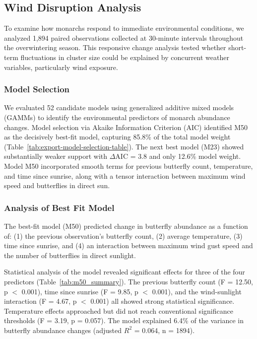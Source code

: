 \subsection{Wind Disruption Analysis}

To examine how monarchs respond to immediate environmental conditions, we analyzed 1,894 paired observations collected at 30-minute intervals throughout the overwintering season. This responsive change analysis tested whether short-term fluctuations in cluster size could be explained by concurrent weather variables, particularly wind exposure.

\subsubsection{Model Selection}

We evaluated 52 candidate models using generalized additive mixed models (GAMMs) to identify the environmental predictors of monarch abundance changes. Model selection via Akaike Information Criterion (AIC) identified M50 as the decisively best-fit model, capturing 85.8\% of the total model weight (Table~\ref{tab:export-model-selection-table}). The next best model (M23) showed substantially weaker support with $\Delta$AIC = 3.8 and only 12.6\% model weight. Model M50 incorporated smooth terms for previous butterfly count, temperature, and time since sunrise, along with a tensor interaction between maximum wind speed and butterflies in direct sun.

 

\subsubsection{Analysis of Best Fit Model}

The best-fit model (M50) predicted change in butterfly abundance as a function of: (1) the previous observation's butterfly count, (2) average temperature, (3) time since sunrise, and (4) an interaction between maximum wind gust speed and the number of butterflies in direct sunlight.

Statistical analysis of the model revealed significant effects for three of the four predictors (Table~\ref{tab:m50_summary}). The previous butterfly count (F = 12.50, p $<$ 0.001), time since sunrise (F = 9.85, p $<$ 0.001), and the wind-sunlight interaction (F = 4.67, p $<$ 0.001) all showed strong statistical significance. Temperature effects approached but did not reach conventional significance thresholds (F = 3.19, p = 0.057). The model explained 6.4\% of the variance in butterfly abundance changes (adjusted $R^2$ = 0.064, n = 1894).

